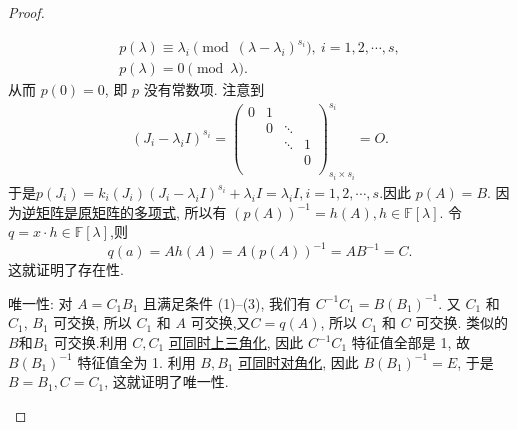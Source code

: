 \documentclass[../../main.tex]{subfiles}
\begin{document}
\begin{proof}
\begin{enumerate}
\begin{gather*}
p(\lambda) \equiv \lambda_i \pmod{(\lambda - \lambda_i)^{s_i}},\ i = 1, 2, \cdots, s,
\\
p(\lambda) = 0 \pmod{\lambda}.
\end{gather*}
从而  \( p(0) = 0 \), 即 \( p \) 没有常数项.
注意到
\begin{align*}
\left( J_i-\lambda _iI \right) ^{s_i}=\left( \begin{matrix}
0&		1&		&		\\
&		0&		\ddots&		\\
&		&		\ddots&		1\\
&		&		&		0\\
\end{matrix} \right) _{s_i\times s_i}^{s_i}=O.
\end{align*}
于是$p(J_i)=k_i\left( J_i \right) \left( J_i-\lambda _iI \right) ^{s_i}+\lambda _iI=\lambda _iI,i=1,2,\cdots ,s.$因此 \( p(A) = B.\)
因为\hyperref[proposition:矩阵的逆可以用其多项式表示]{逆矩阵是原矩阵的多项式}, 所以有 \( (p(A))^{-1} = h(A), h \in \mathbb{F}[\lambda] \). 令 \( q = x \cdot h \in \mathbb{F}[\lambda] \),则
$$
q(a)=Ah(A)=A(p(A))^{-1}=AB^{-1}=C.
$$
这就证明了存在性.

{\heiti 唯一性:} 对 \( A = C_1B_1 \) 且满足条件 (1)--(3), 我们有 \( C^{-1}C_1 = B(B_1)^{-1} \). 又 \( C_1 \) 和 \( C_1 \), \( B_1 \) 可交换, 所以 \( C_1 \) 和 \( A \) 可交换,又$C=q(A)$, 所以 \( C_1 \) 和 \( C \) 可交换. 类似的 \( B\)和\( B_1 \) 可交换.利用 \( C, C_1 \) \hyperref[proposition:一族两两可交换的一般域上的矩阵可同时上三角化]{可同时上三角化}, 因此 \( C^{-1}C_1 \) 特征值全部是 1, 故 \( B(B_1)^{-1} \) 特征值全为 1. 利用 \( B, B_1 \) \hyperref[proposition:一族两两可交换的可对角化矩阵可同时相似对角化]{可同时对角化}, 因此 \( B(B_1)^{-1} = E \), 于是 \( B = B_1, C = C_1 \), 这就证明了唯一性.
\end{enumerate}

\end{proof}
\end{document}
